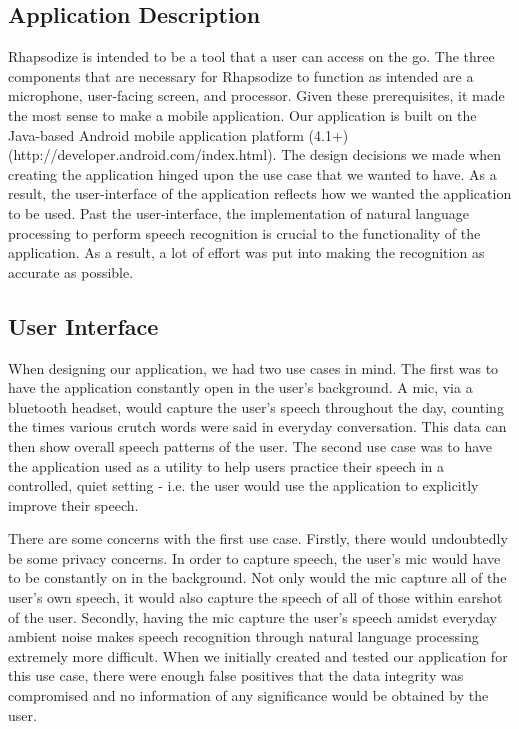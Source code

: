 \documentclass{sigchi}
\begin{document}
\subsection{Application Description}

Rhapsodize is intended to be a tool that a user can access on the go. The three components that are necessary for Rhapsodize to function as intended are a microphone, user-facing screen, and processor. Given these prerequisites, it made the most sense to make a mobile application. Our application is built on the Java-based Android mobile application platform (4.1+) (http://developer.android.com/index.html). The design decisions we made when creating the application hinged upon the use case that we wanted to have. As a result, the user-interface of the application reflects how we wanted the application to be used. Past the user-interface, the implementation of natural language processing to perform speech recognition is crucial to the functionality of the application. As a result, a lot of effort was put into making the recognition as accurate as possible.

\subsection{User Interface}

When designing our application, we had two use cases in mind. The first was to have the application constantly open in the user’s background. A mic, via a bluetooth headset, would capture the user’s speech throughout the day, counting the times various crutch words were said in everyday conversation. This data can then show overall speech patterns of the user. The second use case was to have the application used as a utility to help users practice their speech in a controlled, quiet setting - i.e. the user would use the application to explicitly improve their speech. 

There are some concerns with the first use case. Firstly, there would undoubtedly be some privacy concerns. In order to capture speech, the user’s mic would have to be constantly on in the background. Not only would the mic capture all of the user’s own speech, it would also capture the speech of all of those within earshot of the user. Secondly, having the mic capture the user’s speech amidst everyday ambient noise makes speech recognition through natural language processing extremely more difficult. When we initially created and tested our application for this use case, there were enough false positives that the data integrity was compromised and no information of any significance would be obtained by the user.
\end{document}
